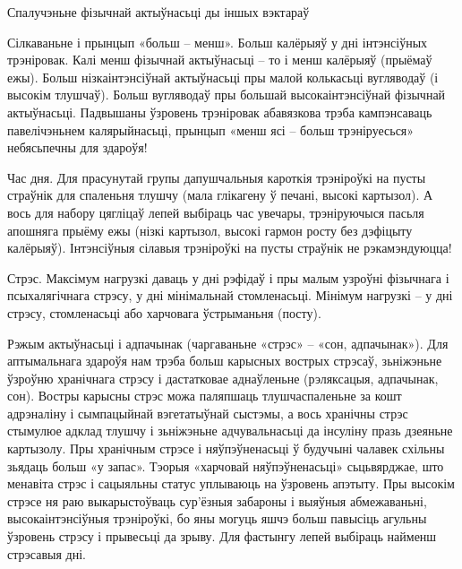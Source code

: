Спалучэньне фізычнай актыўнасьці ды іншых вэктараў

Сілкаваньне і прынцып «больш – менш».
Больш калёрыяў у дні інтэнсіўных трэніровак. Калі менш фізычнай актыўнасьці – то і менш калёрыяў (прыёмаў ежы). Больш нізкаінтэнсіўнай актыўнасьці пры малой колькасьці вугляводаў (і высокім тлушчаў). Больш вугляводаў пры большай высокаінтэнсіўнай фізычнай актыўнасьці. Падвышаны ўзровень трэніровак абавязкова трэба кампэнсаваць павелічэньнем калярыйнасьці, прынцып «менш ясі – больш трэніруесься» небясьпечны для здароўя!

Час дня.
Для прасунутай групы дапушчальныя кароткія трэніроўкі на пусты страўнік для спаленьня тлушчу (мала глікагену ў печані, высокі картызол). А вось для набору цягліцаў лепей выбіраць час увечары, трэніруючыся пасьля апошняга прыёму ежы (нізкі картызол, высокі гармон росту без дэфіцыту калёрыяў). Інтэнсіўныя сілавыя трэніроўкі на пусты страўнік не рэкамэндуюцца!

Стрэс.
Максімум нагрузкі даваць у дні рэфідаў і пры малым узроўні фізычнага і псыхалягічнага стрэсу, у дні мінімальнай стомленасьці. Мінімум нагрузкі – у дні стрэсу, стомленасьці або харчовага ўстрыманьня (посту).

Рэжым актыўнасьці і адпачынак (чаргаваньне «стрэс» – «сон, адпачынак»).
Для аптымальнага здароўя нам трэба больш карысных вострых стрэсаў, зьніжэньне ўзроўню хранічнага стрэсу і дастатковае аднаўленьне (рэляксацыя, адпачынак, сон). Востры карысны стрэс можа паляпшаць тлушчаспаленьне за кошт адрэналіну і сымпацыйнай вэгетатыўнай сыстэмы, а вось хранічны стрэс стымулюе адклад тлушчу і зьніжэньне адчувальнасьці да інсуліну празь дзеяньне картызолу. Пры хранічным стрэсе і няўпэўненасьці ў будучыні чалавек схільны зьядаць больш «у запас». Тэорыя «харчовай няўпэўненасьці» сьцьвярджае, што менавіта стрэс і сацыяльны статус уплываюць на ўзровень апэтыту. Пры высокім стрэсе ня раю выкарыстоўваць сур'ёзныя забароны і выяўныя абмежаваньні, высокаінтэнсіўныя трэніроўкі, бо яны могуць яшчэ больш павысіць агульны ўзровень стрэсу і прывесьці да зрыву. Для фастынгу лепей выбіраць найменш стрэсавыя дні.

